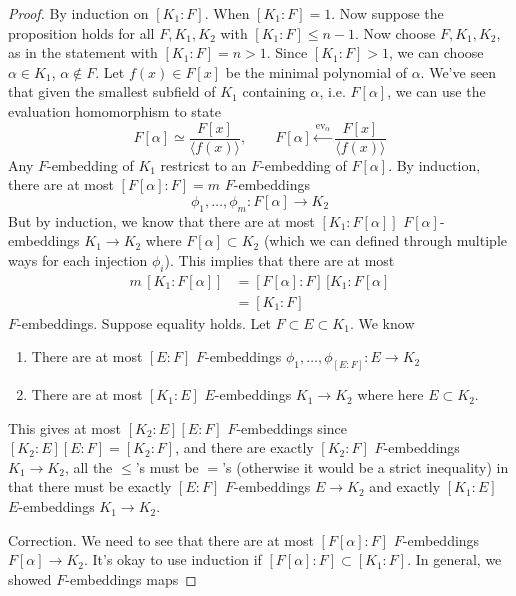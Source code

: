   \begin{proof}
    By induction on $[K_1:F]$. When $[K_1:F] = 1$. Now suppose the proposition holds for all $F, K_1, K_2$ with $[K_1:F] \leq n-1$. Now choose $F, K_1, K_2$, as in the statement with $[K_1 : F] = n > 1$. Since $[K_1: F] > 1$, we can choose $\alpha \in K_1$, $\alpha \not\in F$. Let $f(x) \in F[x]$ be the minimal polynomial of $\alpha$. We've seen that given the smallest subfield of $K_1$ containing $\alpha$, i.e. $F[\alpha]$, we can use the evaluation homomorphism to state 
    \begin{equation}
      F[\alpha] \simeq \frac{F[x]}{\langle f(x)\rangle}, \qquad F[\alpha] \xleftarrow{\mathrm{ev}_\alpha} \frac{F[x]}{\langle f(x)\rangle} 
    \end{equation}
    Any $F$-embedding of $K_1$ restricst to an $F$-embedding of $F[\alpha]$. By induction, there are at most $[F[\alpha]: F] = m$ $F$-embeddings 
    \begin{equation}
      \phi_1, \ldots, \phi_m : F[\alpha] \to K_2
    \end{equation}
    But by induction, we know that there are at most $[K_1: F[\alpha]]$ $F[\alpha]$-embeddings $K_1 \to K_2$ where $F[\alpha] \subset K_2$ (which we can defined through multiple ways for each injection $\phi_i$). This implies that there are at most 
    \begin{align}
      m \, [K_1: F[\alpha]] & = [F[\alpha]: F]\, [K_1: F[\alpha] \\
                            & = [K_1 : F]
    \end{align}
    $F$-embeddings. Suppose equality holds. Let $F \subset E \subset K_1$. We know 
    \begin{enumerate}
      \item There are at most $[E:F]$ $F$-embeddings $\phi_1, \ldots, \phi_{[E:F]}: E \to K_2$ 
      \item There are at most $[K_1:E]$ $E$-embeddings $K_1 \to K_2$ where here $E \subset K_2$. 
    \end{enumerate}
    This gives at most $[K_2:E] [E:F]$ $F$-embeddings since $[K_2 :E] [E:F] = [K_2 :F]$, and there are exactly $[K_2 : F]$ $F$-embeddings $K_1 \to K_2$, all the $\leq$'s must be $=$'s (otherwise it would be a strict inequality) in that there must be exactly $[E:F]$ $F$-embeddings $E \to K_2$ and exactly $[K_1: E]$ $E$-embeddings $K_1 \to K_2$. 

    Correction. We need to see that there are at most $[F[\alpha]:F]$ $F$-embeddings $F[\alpha] \to K_2$. It's okay to use induction if $[F[\alpha]: F] \subset [K_1:F]$. In general, we showed $F$-embeddings maps 
  \end{proof}

